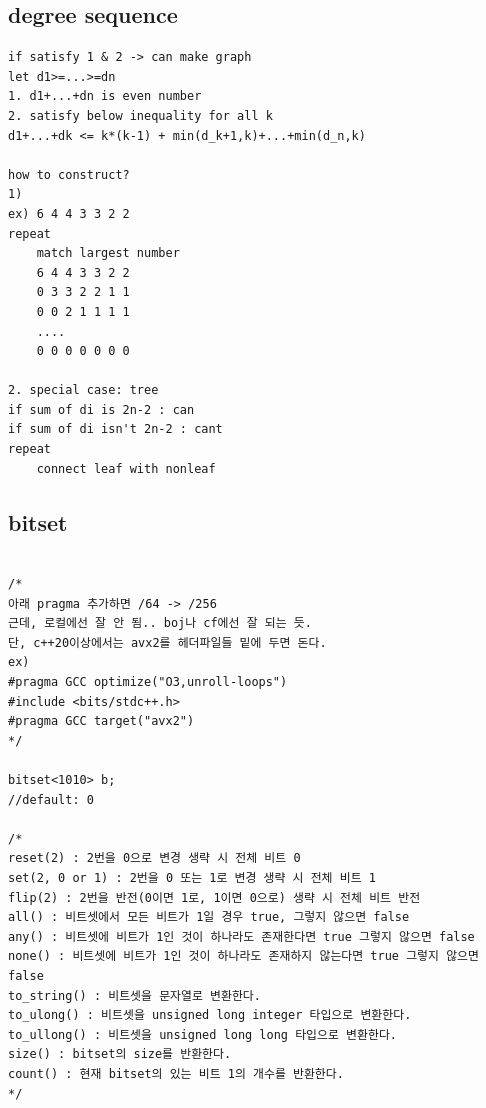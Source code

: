 \documentclass[landscape, 8pt, a4paper, oneside, twocolumn]{extarticle}
\begin{document}
\subsection{degree sequence}
\begin{verbatim}
if satisfy 1 & 2 -> can make graph
let d1>=...>=dn
1. d1+...+dn is even number
2. satisfy below inequality for all k
d1+...+dk <= k*(k-1) + min(d_k+1,k)+...+min(d_n,k)

how to construct?
1) 
ex) 6 4 4 3 3 2 2
repeat
    match largest number
    6 4 4 3 3 2 2
    0 3 3 2 2 1 1
    0 0 2 1 1 1 1
    ....
    0 0 0 0 0 0 0

2. special case: tree
if sum of di is 2n-2 : can
if sum of di isn't 2n-2 : cant
repeat
    connect leaf with nonleaf
\end{verbatim}

\subsection{bitset}
\begin{verbatim}

/*
아래 pragma 추가하면 /64 -> /256
근데, 로컬에선 잘 안 됨.. boj나 cf에선 잘 되는 듯.
단, c++20이상에서는 avx2를 헤더파일들 밑에 두면 돈다.
ex)
#pragma GCC optimize("O3,unroll-loops")
#include <bits/stdc++.h>
#pragma GCC target("avx2")
*/

bitset<1010> b; 
//default: 0

/*
reset(2) : 2번을 0으로 변경 생략 시 전체 비트 0
set(2, 0 or 1) : 2번을 0 또는 1로 변경 생략 시 전체 비트 1
flip(2) : 2번을 반전(0이면 1로, 1이면 0으로) 생략 시 전체 비트 반전
all() : 비트셋에서 모든 비트가 1일 경우 true, 그렇지 않으면 false
any() : 비트셋에 비트가 1인 것이 하나라도 존재한다면 true 그렇지 않으면 false
none() : 비트셋에 비트가 1인 것이 하나라도 존재하지 않는다면 true 그렇지 않으면 false
to_string() : 비트셋을 문자열로 변환한다.
to_ulong() : 비트셋을 unsigned long integer 타입으로 변환한다.
to_ullong() : 비트셋을 unsigned long long 타입으로 변환한다.
size() : bitset의 size를 반환한다.
count() : 현재 bitset의 있는 비트 1의 개수를 반환한다.
*/
\end{verbatim}
\newpage
\end{document}
